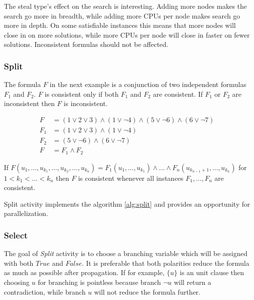 The steal type's effect on the search is interesting. Adding
more nodes makes the search go more in breadth, while adding more
CPUs per node makes search go more in depth. On some satisfiable
instances this means that more nodes will close in on more solutions,
while more CPUs per node will close in faster on fewer solutions.
Inconsistent formulas should not be affected.

\subsubsection{Split}

The formula $F$ in the next example is a conjunction of two
independent formulas $F_1$ and $F_2$. $F$ is consistent only if both
$F_1$ and $F_2$ are consistent. If $F_1$ or $F_2$ are inconsistent
then $F$ is inconsistent.

\begin{align}
  F &= (1 \lor 2 \lor 3) \land (1 \lor \neg 4) \land (5 \lor \neg 6) \land (6 \lor \neg 7) \\
  F_1 &= (1 \lor 2 \lor 3) \land (1 \lor \neg 4) \\
  F_2 &= (5 \lor \neg 6) \land (6 \lor \neg 7) \\
  F &= F_1 \land F_2
\end{align}

\begin{myprop}
  If $F(u_1, \ldots, u_{k_1}, \ldots, u_{k_2}, \ldots, u_{k_n}) =
  F_1(u_1, \ldots, u_{k_1}) \land \ldots \land F_n(u_{k_{n-1}+1},
  \ldots, u_{k_n})$ for $1 < k_1 < \ldots <k_n$ then $F$
  is consistent whenever all instances $F_1, \ldots, F_n$
  are consistent.
\end{myprop}

Split activity implements the algorithm \ref{alg:split} and provides
an opportunity for parallelization.


\subsubsection{Select}
\label{ssec:branching}

The goal of \emph{Split} activity is to choose a branching variable
which will be assigned with both $True$ and $False$. It is preferable
that both polarities reduce the formula as much as possible after
propagation.  If for example, $\{ u \}$ is an unit clause then
choosing $u$ for branching is pointless because branch $\neg u$
will return a contradiction, while branch $u$ will not reduce the
formula further.

